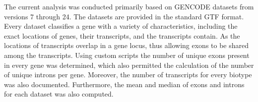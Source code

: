 \documentclass[ncrna,article,submit,moreauthors,pdftex,10pt,a4paper]{mdpi}
\begin{document}
The current analysis was conducted primarily based on GENCODE datasets from versions 7 through 24. 
The datasets are provided in the standard GTF format. Every dataset classifies a gene with a variety of characteristics, including
the exact locations of genes, their transcripts, and the transcripts contain. As the locations of transcripts overlap in a
gene locus, thus allowing exons to be shared among the transcripts.
Using custom scripts the number of unique exons present in every gene was determined, which also permitted the calculation
of the number of unique introns per gene. Moreover, the number of transcripts for every biotype was also documented.
Furthermore, the mean and median of exons and introns for each dataset was also computed.
\begin{figure}[h]
\centering
\end{figure}
  
\end{document}
